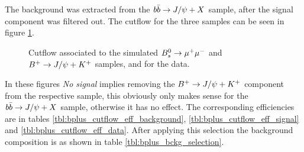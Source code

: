 The background was extracted from the $b\bar{b}\rightarrow J/\psi+X$ sample, after the signal component was filtered out.
The cutflow for the three samples can be seen in figure \ref{fig:bplus_fit_cutflow}.

\begin{figure}[ht]
    \centering

    \caption{Cutflow associated to the simulated $B_{s}^{0}\rightarrow \mu^{+}\mu^{-}$ and $B^{+}\rightarrow J/\psi+K^{+}$ samples, and for the data.}
    \label{fig:bplus_fit_cutflow}
\end{figure}

In these figures \textit{No signal} implies removing the $B^{+}\rightarrow J/\psi+K^{+}$ component
from the respective sample, this obviously only makes sense for the $b\bar{b}\rightarrow J/\psi+X$ sample,
otherwise it has no effect. The corresponding efficiencies are in tables \ref{tbl:bplus_cutflow_eff_background},
\ref{tbl:bplus_cutflow_eff_signal} and \ref{tbl:bplus_cutflow_eff_data}. After applying 
this selection the background composition is as shown in table \ref{tbl:bplus_bckg_selection}.

